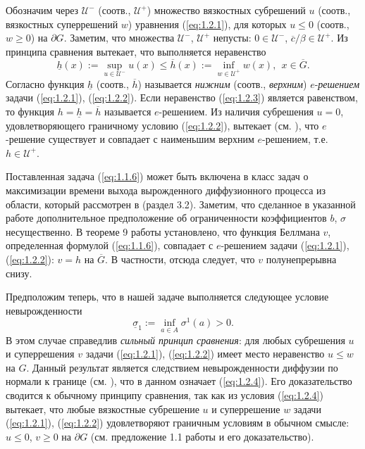 Обозначим через $\mathcal U^-$ (соотв., $\mathcal U^+$) множество вязкостных субрешений $u$ (соотв., вязкостных суперрешений  $w$) уравнения (\ref{eq:1.2.1}), для которых $u\le 0$ (соотв., $w\ge 0$) на $\partial G$. Заметим, что множества $\mathcal U^-$, $\mathcal U^+$ непусты: $0\in\mathcal U^-$, $\overline{c}/\beta\in\mathcal U^+$.
Из принципа сравнения вытекает, что выполняется неравенство
\begin{equation} \label{eq:1.2.3}
\underline h(x):=\sup_{u\in\mathcal U^-} u(x)\le\overline h(x):=\inf_{w\in\mathcal U^+} w(x),\ \ x\in\overline G.
\end{equation}
Согласно \cite{BarBot98} функция $\underline h$ (соотв., $\overline h$) называется \emph{нижним} (соотв., \emph{верхним}) $e$-\emph{решением} задачи (\ref{eq:1.2.1}), (\ref{eq:1.2.2}). Если неравенство (\ref{eq:1.2.3}) является равенством, то функция $h=\underline h=\overline h$ называется $e$-решением. Из наличия субрешения $u=0$, удовлетворяющего граничному условию (\ref{eq:1.2.2}), вытекает (см. \cite[теорема 2]{BarBot98}), что $e$-решение существует и совпадает с наименьшим верхним $e$-решением, т.е. $h\in\mathcal U^+$.

Поставленная задача (\ref{eq:1.1.6}) может быть включена в класс задач о максимизации времени выхода вырожденного диффузионного процесса из области, который рассмотрен в \cite{BarBot98} (раздел 3.2). Заметим, что сделанное в указанной работе дополнительное предположение об ограниченности коэффициентов $b$, $\sigma$ несущественно. В теореме 9 работы \cite{BarBot98} установлено, что функция Беллмана $v$, определенная формулой (\ref{eq:1.1.6}), совпадает с $e$-решением задачи (\ref{eq:1.2.1}), (\ref{eq:1.2.2}): $v=h$ на $\overline G$. В частности, отсюда следует, что $v$ полунепрерывна снизу.

Предположим теперь, что в нашей задаче выполняется следующее условие невырожденности
\begin{equation} \label{eq:1.2.4}
\underline{\sigma}_1:=\inf_{a\in A}\sigma^1(a)>0.
\end{equation}
В этом случае справедлив \emph{сильный принцип сравнения}: для любых субрешения $u$ и суперрешения $v$ задачи (\ref{eq:1.2.1}), (\ref{eq:1.2.2}) имеет место неравенство $u\le w$ на $G$. Данный результат является следствием невырожденности диффузии по нормали к границе (см. \cite{BarBur95, BarRou98}), что в данном означает (\ref{eq:1.2.4}). Его доказательство сводится к обычному принципу сравнения, так как из условия (\ref{eq:1.2.4}) вытекает, что любые вязкостные субрешение $u$ и суперрешение $w$ задачи (\ref{eq:1.2.1}), (\ref{eq:1.2.2}) удовлетворяют граничным условиям в обычном смысле: $u\le 0$, $v\ge 0$ на $\partial G$ (см. предложение 1.1 работы  \cite{BarBur95} и его доказательство).

